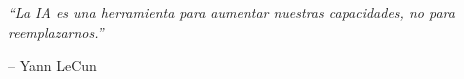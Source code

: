 
\thispagestyle{empty}
\vspace*{\fill}
\begin{flushright}
\begin{minipage}{0.75\textwidth}
\begin{flushright}
\textit{``La IA es una herramienta para aumentar nuestras capacidades, no para reemplazarnos.''}

\vspace{0.6em}
-- Yann LeCun
\end{flushright}
\end{minipage}
\end{flushright}
\vspace*{\fill}
\clearpage
